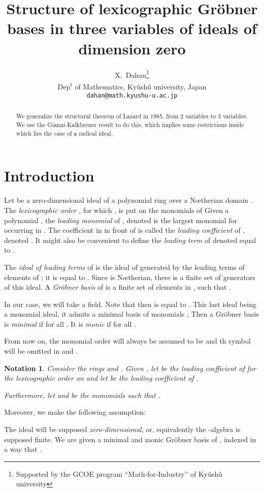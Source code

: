 \documentclass[a4paper,11pt]{article}
\title{Structure of lexicographic Gr\"obner bases in three variables
of ideals of dimension zero}
\author{X.~Dahan\footnote{Supported by the GCOE program ``Math-for-Industry''
of Ky\^ush\^u university}\bigskip
\\
Dep\textsuperscript{t} of Mathematics, Ky\^ush\^u university, Japan\\
{\tt dahan@math.kyushu-u.ac.jp}}
\date{}
\newtheorem{Not}{Notation}
\begin{document}
\maketitle

\begin{abstract}
We generalize  the structural theorem of Lazard in 1985,
from 2 variables to 3 variables.
We use the Gianni-Kalkbrener result to do this,
which implies some restrictions
inside which lies the case of a radical ideal.
\end{abstract}

\section{Introduction}
Let  be a zero-dimensional ideal of a polynomial
ring  over a N\oe therian domain .
The {\em lexicographic order}
, for which
,
is put on the monomials 
of  
Given a polynomial ,
the {\em leading monomial} of ,
denoted  is the largest
monomial for  occurring in .
The coefficient in  in front of 
is called the {\em leading coefficient} of ,
denoted .
It might also be convenient to define the
{\em leading term} of 
denoted  equal to .

The {\em ideal of leading terms} of  is the ideal
of  generated by the leading terms of elements
of ; it is equal to .
Since  is N\oe therian, there is a finite set of generators
of this ideal.
A {\em Gr\"obner basis} of 
is a finite set of elements in ,
 such that .

In our case, we will take  a field.
Note that then 
is equal to .
This last ideal being a monomial ideal, it admits a minimal basis
of monomials ; Then a Gr\"obner basis
 is {\em minimal} if  for all .
It is  {\em monic} if  for all .

From now on, the monomial order will always be assumed
to be  and th symbol  will be omitted
in  and .

\begin{Not}
Consider the rings  and .
Given , let 
be the leading coefficient of  for the lexicographic order 
on  and let  be the leading coefficient
of .

Furthermore, let  and  be the monomials
such that
.
\end{Not}
Moreover, we make the following  assumption:
\smallskip

The ideal  will be supposed {\em zero-dimensional},
or, equivalently the -algebra  is supposed finite.
We are given a minimal and monic Gr\"obner basis 
 of ,
indexed in a way that .
 \smallskip
\end{document}
